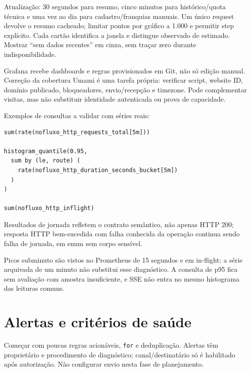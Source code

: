 \documentclass[10pt,a4paper]{article}
\begin{document}
Atualização: 30 segundos para resumo, cinco minutos para histórico/quota
técnica e uma vez ao dia para cadastro/franquias manuais. Um único
request devolve o resumo cacheado; limitar pontos por gráfico a 1.000 e
permitir step explícito. Cada cartão identifica a janela e distingue
observado de estimado. Mostrar ``sem dados recentes'' em cinza, sem
traçar zero durante indisponibilidade.

Grafana recebe dashboards e regras provisionados em Git, não só edição
manual. Correção da cobertura Umami é uma tarefa própria: verificar
script, website ID, domínio publicado, bloqueadores, envio/recepção e
timezone. Pode complementar visitas, mas não substituir identidade
autenticada ou prova de capacidade.

Exemplos de consultas a validar com séries reais:

\begin{verbatim}
sum(rate(nofluxo_http_requests_total[5m]))

histogram_quantile(0.95,
  sum by (le, route) (
    rate(nofluxo_http_duration_seconds_bucket[5m])
  )
)

sum(nofluxo_http_inflight)
\end{verbatim}

Resultados de jornada refletem o contrato semântico, não apenas HTTP
200; resposta HTTP bem-sucedida com falha conhecida da operação continua
sendo falha de jornada, em enum sem corpo sensível.

Picos subminuto são vistos no Prometheus de 15 segundos e em in-flight;
a série arquivada de um minuto não substitui esse diagnóstico. A
consulta de p95 fica sem avaliação com amostra insuficiente, e SSE não
entra no mesmo histograma das leituras comuns.

\clearpage
\section{Alertas e critérios de
saúde}\label{alertas-e-crituxe9rios-de-sauxfade}

Começar com poucas regras acionáveis, {\footnotesize\ttfamily\nolinkurl{for}} e deduplicação.
Alertas têm proprietário e procedimento de diagnóstico;
canal/destinatário só é habilitado após autorização. Não configurar
envio nesta fase de planejamento.
\end{document}
